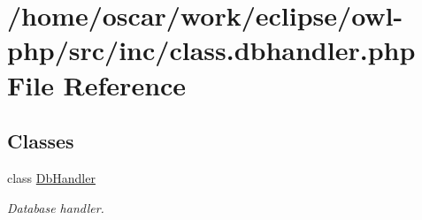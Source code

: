 \hypertarget{class_8dbhandler_8php}{
\section{/home/oscar/work/eclipse/owl-php/src/inc/class.dbhandler.php File Reference}
\label{class_8dbhandler_8php}
}
\subsection*{Classes}
\begin{CompactItemize}
\item 
class \hyperlink{classDbHandler}{DbHandler}
\begin{CompactList}\small\item\em Database handler. \item\end{CompactList}\end{CompactItemize}
